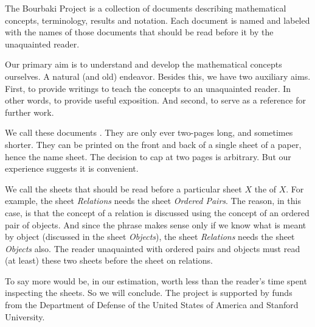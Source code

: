 
\sbasic

\sstart
{}

The Bourbaki Project is a collection
of documents describing mathematical
concepts, terminology, results and
notation. Each document is named and
labeled with the names of those documents
that should be read before it by the
unaquainted reader.

Our primary aim is to understand and
develop the mathematical concepts ourselves.
A natural (and old) endeavor.
Besides this, we have two auxiliary aims.
First, to provide writings to teach
the concepts to an unaquainted reader. In other
words, to provide useful exposition.
And second, to serve as a reference for
further work.

We call these documents .
They are only ever two-pages long, and
sometimes shorter.
They can be printed on the front
and back of a single
sheet of a paper, hence the name sheet.
The decision to cap at two pages is
arbitrary.
But our
experience suggests it is convenient.

We call the sheets that should
be read before a particular sheet
$X$ the  of $X$.
For example, the sheet \textit{Relations}
needs the sheet \textit{Ordered Pairs}.
The reason, in this case, is that the
concept of a relation is discussed using
the concept of an ordered pair of objects.
And since the phrase
 makes sense
only if we know what is meant by object
(discussed in the sheet \textit{Objects}),
the sheet \textit{Relations} needs the sheet
\textit{Objects} also.
The reader unaquainted with
ordered pairs and
objects must read (at least) these two
sheets before the sheet on relations.



%
%


To say more would be, in our
estimation,
worth less than the reader's
time spent inspecting the sheets.
So we will conclude.
The project is supported by
funds from the Department of
Defense of the United States of America
and Stanford University.
\strats

